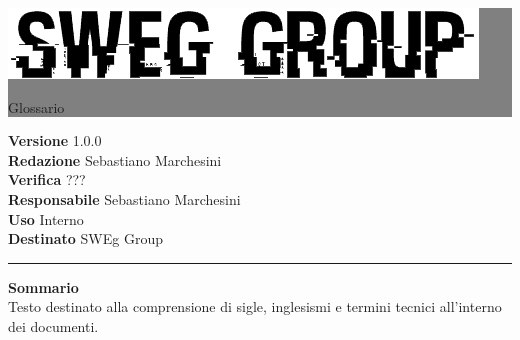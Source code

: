\documentclass[12pt,a4paper,titlepage]{article}
\newcommand{\HRule}[1]{\hfill \rule{0.2\linewidth}{#1}} %
\begin{document}
	
	\thispagestyle{empty} %
	
	
	\colorbox{grey}{
		\parbox[t]{1.0\linewidth}{
			\centering \fontsize{50pt}{80pt}\selectfont %
			\vspace*{0.7cm} %
		
				\raggedleft
				\includegraphics[width=0.7\linewidth]{../../LogoSWEgGroupSFONDOVUOTO}
			
			\hfill Glossario \\
			
			\vspace*{0.7cm} %
		}
	}
	
	
	\vfill %
	
	
	{\centering \large 
		\hfill \textbf{Versione} 1.0.0 \\
		\hfill \textbf{Redazione} Sebastiano Marchesini \\
		\hfill \textbf{Verifica} ??? \\
		\hfill \textbf{Responsabile} Sebastiano Marchesini \\
		\hfill \textbf{Uso} Interno \\
		\hfill \textbf{Destinato} SWEg Group \\ 
		
		\HRule{1pt}
	
	\textbf{Sommario} \\
	Testo destinato alla comprensione di sigle, inglesismi e termini tecnici all'interno dei documenti.

	} %
\end{document}
